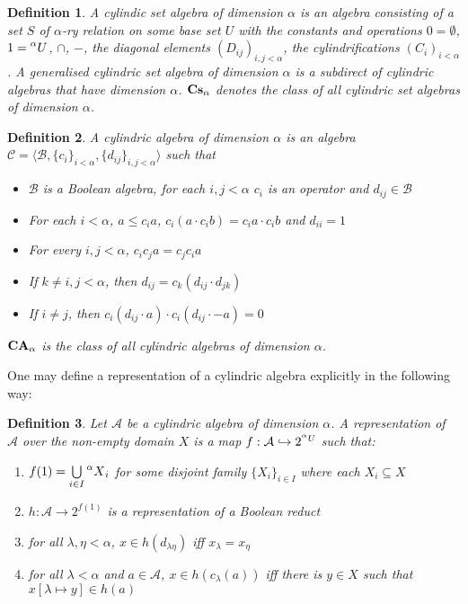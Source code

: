 \documentclass[a4paper]{article}
\theoremstyle{defin}
\newtheorem{defin}{Definition}
\theoremstyle{theorem}
\theoremstyle{claim}
\theoremstyle{prop}
\theoremstyle{lemma}
\theoremstyle{fact}
\theoremstyle{ex}
\theoremstyle{col}
\begin{document}
\begin{defin}
 A cylindic set algebra of dimension $\alpha$ is an algebra consisting of a set $S$ of $\alpha$-ry relation on some base set $U$
   with the constants and operations $0 = \emptyset$, $1 = \prescript{\alpha}{}U$, $\cap$, $-$, the diagonal elements $(D_{ij})_{i, j < \alpha}$, the cylindrifications $(C_i)_{i < \alpha}$. A generalised cylindric set algebra of dimension $\alpha$ is a subdirect of cylindric algebras that have dimension $\alpha$.
   ${\bf Cs}_{\alpha}$ denotes the class of all cylindric set algebras of dimension $\alpha$.
\end{defin}

\begin{defin}
   A cylindric algebra of dimension $\alpha$ is an algebra $\mathcal{C} = \langle \mathcal{B}, \{ c_i \}_{i < \alpha}, \{ d_{ij} \}_{i, j < \alpha} \rangle$ such that
   \begin{itemize}
     \item $\mathcal{B}$ is a Boolean algebra, for each $i, j < \alpha$ $c_i$ is an operator and $d_{ij} \in \mathcal{B}$
     \item For each $i < \alpha$, $a \leq c_i a$, $c_i (a \cdot c_i b) = c_i a \cdot c_i b$ and $d_{ii} = 1$
     \item For every $i, j < \alpha$, $c_i c_j a = c_j c_i a$
     \item If $k \neq i, j < \alpha$, then $d_{ij} = c_k (d_{ij} \cdot d_{jk})$
     \item If $i \neq j$, then $c_i (d_{ij} \cdot a) \cdot c_i (d_{ij} \cdot - a) = 0$
   \end{itemize}
   ${\bf CA}_{\alpha}$ is the class of all cylindric algebras of dimension $\alpha$.
\end{defin}

One may define a representation of a cylindric algebra explicitly in the following way:

\begin{defin}
 Let $\mathcal{A}$ be a cylindric algebra of dimension $\alpha$. A representation of $\mathcal{A}$ over the non-empty domain $X$ is a map $f : \mathcal{A} \hookrightarrow 2^{\prescript{\alpha}{}U}$ such that:
 \begin{enumerate}
   \item $f(1) = \bigcup \limits_{i \in I} \prescript{\alpha}{}X_i$ for some disjoint family $\{X_i\}_{i \in I}$ where each $X_i \subseteq X$
   \item $h : \mathcal{A} \to 2^{f(1)}$ is a representation of a Boolean reduct
   \item for all $\lambda, \eta < \alpha$, $x \in h(d_{\lambda \eta})$ iff $x_{\lambda} = x_{\eta}$
   \item for all $\lambda < \alpha$ and $a \in \mathcal{A}$, $x \in h(c_{\lambda}(a))$ iff there is $y \in X$ such that $x[\lambda \mapsto y] \in h(a)$
 \end{enumerate}
\end{defin}
\end{document}
